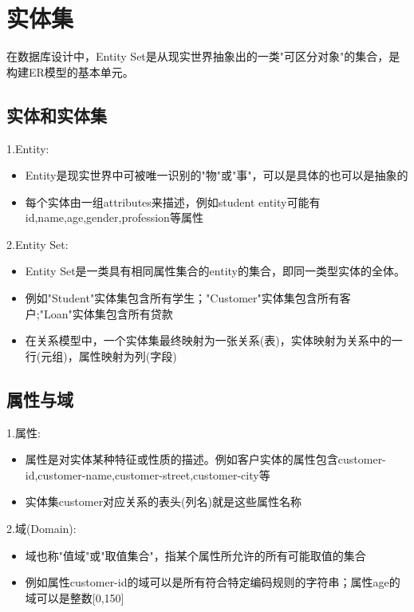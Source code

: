 \section{实体集}

在数据库设计中，Entity Set是从现实世界抽象出的一类"可区分对象"的集合，是构建ER模型的基本单元。

\subsection{实体和实体集}

1.Entity:
\begin{itemize}
    \item Entity是现实世界中可被唯一识别的"物"或"事"，可以是具体的也可以是抽象的
    \item 每个实体由一组attributes来描述，例如student entity可能有id,name,age,gender,profession等属性
\end{itemize}

2.Entity Set:
\begin{itemize}
    \item Entity Set是一类具有相同属性集合的entity的集合，即同一类型实体的全体。
    \item 例如"Student"实体集包含所有学生；"Customer"实体集包含所有客户;"Loan"实体集包含所有贷款
    \item 在关系模型中，一个实体集最终映射为一张关系(表)，实体映射为关系中的一行(元组)，属性映射为列(字段)
\end{itemize}

\subsection{属性与域}

1.属性:
\begin{itemize}
    \item 属性是对实体某种特征或性质的描述。例如客户实体的属性包含customer-id,customer-name,customer-street,customer-city等
    \item 实体集customer对应关系的表头(列名)就是这些属性名称
\end{itemize}

2.域(Domain):
\begin{itemize}
    \item 域也称"值域"或"取值集合"，指某个属性所允许的所有可能取值的集合
    \item 例如属性customer-id的域可以是所有符合特定编码规则的字符串；属性age的域可以是整数[0,150]
\end{itemize}

